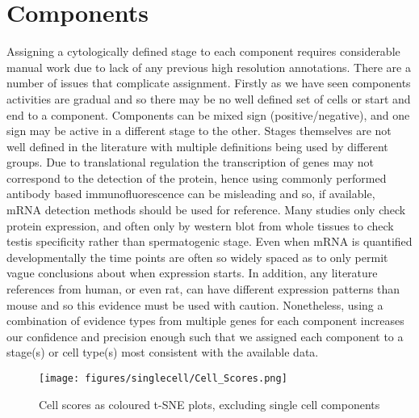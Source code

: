 \section{Components}
\label{sec:components}

Assigning a cytologically defined stage to each component requires considerable manual work due to lack of any previous high resolution annotations. There are a number of issues that complicate assignment. Firstly as we have seen components activities are gradual and so there may be no well defined set of cells or start and end to a component. Components can be mixed sign (positive/negative), and one sign may be active in a different stage to the other. Stages themselves are not well defined in the literature with multiple definitions being used by different groups. Due to translational regulation the transcription of genes may not correspond to the detection of the protein, hence using commonly performed antibody based immunofluorescence can be misleading and so, if available, mRNA detection methods should be used for reference. Many studies only check protein expression, and often only by western blot from whole tissues to check testis specificity rather than spermatogenic stage. Even when mRNA is quantified developmentally the time points are often so widely spaced as to only permit vague conclusions about when expression starts. In addition, any literature references from human, or even rat, can have different expression patterns than mouse and so this evidence must be used with caution. Nonetheless, using a combination of evidence types from multiple genes for each component increases our confidence and precision enough such that we assigned each component to a stage(s) or cell type(s) most consistent with the available data.


\begin{figure}[H]
	\centering
	\texttt{[image: figures/singlecell/Cell\_Scores.png]}
	\caption[SDA Cell Scores]{Cell scores as coloured t-SNE plots, excluding single cell components}
	\label{fig:Cell_Scores}
\end{figure}




